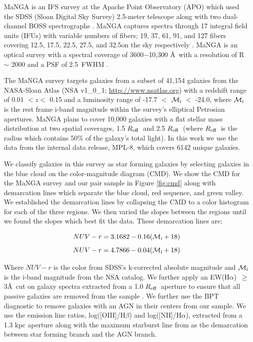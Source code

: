 \documentclass[iop,revtex4,twocolumn,apj,numberedappendix,appendixfloats]{emulateapj}
\newcommand{\reff}{$R_{\rm eff}$}
\newcommand{\ewha}{EW(H$\alpha$)}
\begin{document}
MaNGA is an IFS survey at the Apache Point Observatory (APO) which used the SDSS (Sloan Digital Sky Survey) 2.5-meter telescope along with two dual-channel BOSS spectrographs \citep{Drory:2015}. MaNGA captures spectra through 17 integral field units (IFUs) with variable numbers of fibers; 19, 37, 61, 91, and 127 fibers covering 12.5\arcsec, 17.5\arcsec, 22.5\arcsec, 27.5\arcsec, and 32.5\arcsec on the sky respectively \citep{Law:2015}. MaNGA is an optical survey with a spectral coverage of 3600$-$10,300 \AA\ with a resolution of R $\sim$ 2000 and a PSF of 2.5\arcsec\ FWHM \citep{Bundy:2015}. 

The MaNGA survey targets galaxies from a subset of 41,154 galaxies from the NASA-Sloan Atlas (NSA v1\_0\_1; \url{http://www.nsatlas.org}) with a redshift range of 0.01 $< z <$ 0.15 and a luminosity range of -17.7 $<$ $\mathcal{M_{\rm i}}$ $<$ -24.0, where $\mathcal{M_{\rm i}}$ is the rest frame i-band magnitude within the survey's elliptical Petrosian apertures. MaNGA plans to cover 10,000 galaxies with a flat stellar mass distribution at two spatial coverages, 1.5 \reff\ and 2.5 \reff\ (where \reff\ is the radius which contains 50\% of the galaxy's total light). In this work we use the data from the internal data release, MPL-8, which covers 6142 unique galaxies. 

We classify galaxies in this survey as star forming galaxies by selecting galaxies in the blue cloud on the color-magnitude diagram (CMD). We show the CMD for the MaNGA survey and our pair sample in Figure \ref{fig:cmd} along with demarcation lines which separate the blue cloud, red sequence, and green valley. We established the demarcation lines by collapsing the CMD to a color histogram for each of the three regions. We then varied the slopes between the regions until we found the slopes which best fit the data. These demarcation lines are;

\begin{equation}\label{eq:blue}
NUV-r = 3.1682 - 0.16 (\mathcal{M}_{\rm i}+18)
\end{equation}
\begin{equation}\label{eq:red}
NUV-r = 4.7866 - 0.04 (\mathcal{M}_{\rm i}+18)
\end{equation}

Where $NUV-r$ is the color from SDSS's k-corrected absolute magnitude and $\mathcal{M}_{\rm i}$ is the i-band magnitude from the NSA catalog. We further apply an \ewha\ $\ge$ 3\AA\ cut on galaxy spectra extracted from a 1.0 \reff\ aperture to ensure that all passive galaxies are removed from the sample \citep{Cid-Fernandes:2011}. We further use the BPT diagnostic \citep{Baldwin:1981} to remove galaxies with an AGN in their centers from our sample. We use the emission line ratios, log([O\textsc{III}]/H$\beta$) and log([N\textsc{II}]/H$\alpha$), extracted from a 1.3 kpc aperture along with the maximum starburst line from \citet{Kewley:2001} as the demarcation between star forming branch and the AGN branch.
\end{document}

